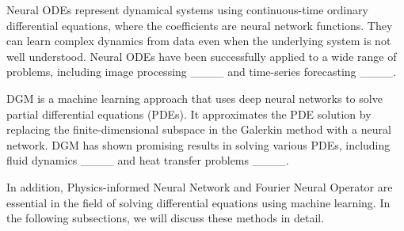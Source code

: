 Neural ODEs represent dynamical systems using continuous-time ordinary differential equations, where the coefficients are neural network functions. They can learn complex dynamics from data even when the underlying system is not well understood. Neural ODEs have been successfully applied to a wide range of problems, including image processing ____ and time-series forecasting ____.

DGM is a machine learning approach that uses deep neural networks to solve partial differential equations (PDEs). It approximates the PDE solution by replacing the finite-dimensional subspace in the Galerkin method with a neural network. DGM has shown promising results in solving various PDEs, including fluid dynamics ____ and heat transfer problems ____.

In addition, Physics-informed Neural Network and Fourier Neural Operator are essential in the field of solving differential equations using machine learning. In the following subsections, we will discuss these methods in detail.





